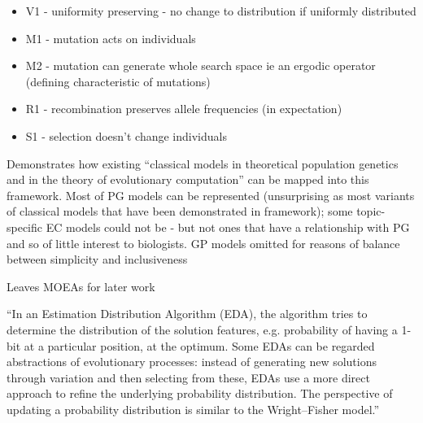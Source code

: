 	\begin{itemize}
		\item
		
		V1 - uniformity preserving - no change to distribution if uniformly
		distributed
		
		\item
		
		M1 - mutation acts on individuals
		
		\item
		
		M2 - mutation can generate whole search space ie an ergodic operator
		(defining characteristic of mutations)
		
		\item
		
		R1 - recombination preserves allele frequencies (in expectation)
		
		\item
		
		S1 - selection doesn't change individuals
		
	\end{itemize}

	Demonstrates how existing ``classical models in theoretical population
	genetics and in the theory of evolutionary computation'' can be mapped
	into this framework. Most of PG models can be represented
	(unsurprising as most variants of classical models that have been
	demonstrated in framework); some topic-specific EC models could not be
	- but not ones that have a relationship with PG and so of little
	interest to biologists. GP models omitted for reasons of balance
	between simplicity and inclusiveness
	
	Leaves MOEAs for later work

	``In an Estimation Distribution Algorithm (EDA), the algorithm tries
	to determine the distribution of the solution features, e.g.
	probability of having a 1-bit at a particular position, at the
	optimum. Some EDAs can be regarded abstractions of evolutionary
	processes: instead of generating new solutions through variation and
	then selecting from these, EDAs use a more direct approach to refine
	the underlying probability distribution. The perspective of updating a
	probability distribution is similar to the Wright--Fisher model.''
		
